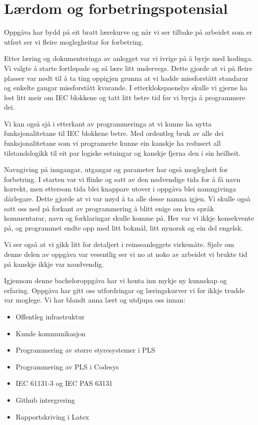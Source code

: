 \section{Lærdom og forbetringspotensial}
\thispagestyle{fancy}

Oppgåva har bydd på eit bratt lærekurve og når vi ser tilbake på arbeidet som er utført
ser vi fleire moglegheitar for forbetring.

Etter læring og dokumenteringa av anlegget var vi ivrige på å byrje med kodinga.
Vi valgte å starte fortløpade og så lære litt undervegs.
Dette gjorde at vi på fleire plasser var nødt til å ta ting oppigjen grunna at vi hadde missforstått standarar og enkelte gangar missforstått kvarande.
I etterklokspaenslys skulle vi gjerne ha lest litt meir om \gls{IEC} blokkene og tatt litt betre tid før vi byrja å programmere dei.

Vi kan også sjå i etterkant av programmeringa at vi kunne ha nytta funksjonalitetane til IEC blokkene betre.
Med ordentleg bruk av alle dei funksjonalitetane som vi programerte kunne ein kanskje ha redusert all tilstandslogikk
til eit par logiske setningar og kanskje fjerna den i sin heilheit.

Navngiving på inngangar, utgangar og parameter har også moglegheit for forbetring.
I starten var vi flinke og satt av den nødvendige tida for å få navn korrekt, men ettersom tida blei knappare utover i oppgåva
blei namngivinga dårlegare. Dette gjorde at vi var nøyd å ta alle desse namna igjen. \newline
Vi skulle også satt oss ned på forkant av programmering å blitt enige om kva språk kommentarar, navn og forklaringar skulle komme på.
Her var vi ikkje konsekvente på, og programmet endte opp med litt bokmål, litt nynorsk og ein del engelsk.

Vi ser også at vi gikk litt for detaljert i reinseanleggets virkemåte.
Sjølv om denne delen av oppgåva var vesentlig ser vi no at noko av arbeidet vi brukte tid på kanskje ikkje var naudvendig.

Igjennom denne bacheloroppgåva har vi henta inn mykje ny kunnskap og erfaring.
Oppgåva har gitt oss utfordringar og læringskurver vi før ikkje trudde var moglege.
Vi har blandt anna lært og utdjupa oss innan:

\begin{itemize}
    \item Offentleg infrastruktur
    \item Kunde kommunikasjon
    \item Programmering av større styresystemer i PLS
    \item Programmering av PLS i Codesys
    \item IEC 61131-3 og IEC PAS 63131
    \item Github intergrering
    \item Rapportskriving i Latex
\end{itemize}

